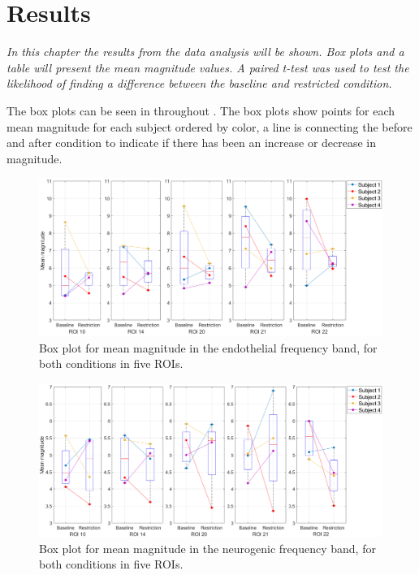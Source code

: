 \chapter{Results}
\textit{In this chapter the results from the data analysis will be shown. Box plots and a table will present the mean magnitude values. A paired t-test was used to test the likelihood of finding a difference between the baseline and restricted condition.}

The box plots can be seen in  throughout . The box plots show points for each mean magnitude for each subject ordered by color, a line is connecting the before and after condition to indicate if there has been an increase or decrease in magnitude. 

\begin{figure}[H]
	\includegraphics[width=1\textwidth]{figures/boxplot_endo}
	\caption{Box plot for mean magnitude in the endothelial frequency band, for both conditions in five ROIs.}
	\label{fig:boxEndo}
\end{figure}

\begin{figure}[H]
	\includegraphics[width=1\textwidth]{figures/boxplot_neuro}
	\caption{Box plot for mean magnitude in the neurogenic frequency band, for both conditions in five ROIs.}
	\label{fig:boxNeuro}
\end{figure}


